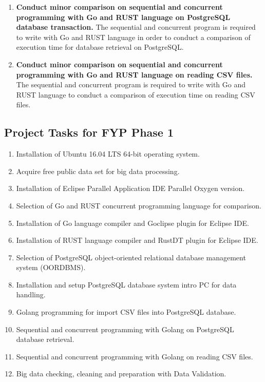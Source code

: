 \begin{enumerate}
\item \textbf{Conduct minor comparison on sequential and concurrent programming with Go and RUST language on PostgreSQL database transaction.} The sequential and concurrent program is required to write with Go and RUST language in order to conduct a comparison of execution time for database retrieval on PostgreSQL.

\item \textbf{Conduct minor comparison on sequential and concurrent programming with Go and RUST language on reading CSV files. } The sequential and concurrent program is required to write with Go and RUST language to conduct a comparison of execution time on reading CSV files.


\end{enumerate}

\pagebreak

\subsection{Project Tasks for FYP Phase 1}

\begin{enumerate}[topsep=0pt,itemsep=-1ex,partopsep=1ex,parsep=1.5ex]
	
\item Installation of Ubuntu 16.04 LTS 64-bit operating system.
\item Acquire free public data set for big data processing.
\item Installation of  Eclipse Parallel Application IDE Parallel Oxygen version. 
\item Selection of Go and RUST concurrent programming language for comparison.
\item Installation of Go language compiler and Goclipse plugin for Eclipse IDE.
\item Installation of RUST language compiler and RustDT plugin for Eclipse IDE.
\item Selection of PostgreSQL object-oriented relational database management system (OORDBMS).
\item Installation and setup PostgreSQL database system intro PC for data handling.
\item Golang programming for import CSV files into PostgreSQL database.
\item Sequential and concurrent programming with Golang on PostgreSQL database retrieval.
\item Sequential and concurrent programming with Golang on reading CSV files.
\item Big data checking, cleaning and preparation with Data Validation. 

\end{enumerate}

